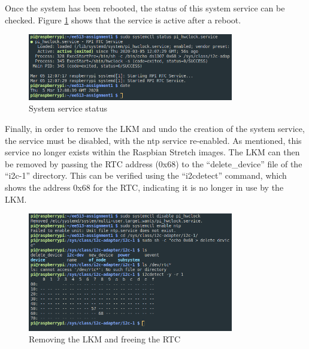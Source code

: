 Once the system has been rebooted, the status of this system service can be
checked. Figure \ref{fig:images-lkm7} shows that the service is active after a
reboot.

\begin{figure}[H]
	\centering
	\includegraphics[width=0.8\textwidth]{images/lkm7}
	\caption{System service status}
	\label{fig:images-lkm7}
\end{figure}

Finally, in order to remove the LKM and undo the creation of the system service,
the service must be disabled, with the ntp service re-enabled. As mentioned,
this service no longer exists within the Raspbian Stretch images. The LKM can
then be removed by passing the RTC address (0x68) to the ``delete\_device'' file
of the ``i2c-1'' directory. This can be verified using the ``i2cdetect''
command, which shows the address 0x68 for the RTC, indicating it is no longer in
use by the LKM.

\begin{figure}[H]
	\centering
	\includegraphics[width=0.8\textwidth]{images/lkm8}
	\caption{Removing the LKM and freeing the RTC}
	\label{fig:images-lkm8}
\end{figure}
